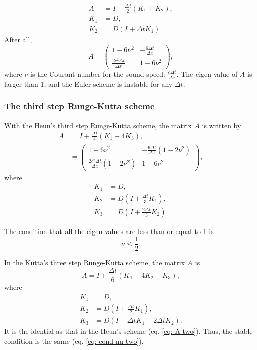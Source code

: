 \begin{align}
  A &= I + \frac{\Delta t}{2}(K_1 + K_2), \\
  K_1 &= D, \\
  K_2 &= D (I + \Delta t K_1).
\end{align}
After all,
\begin{equation}
  A = \begin{pmatrix}
    1-6\nu^2 & -\frac{6\Delta t}{\Delta x} \\
    \frac{2c^2\Delta t}{\Delta x} & 1-6\nu^2
    \end{pmatrix},
\end{equation}
where $\nu$ is the Courant number for the sound speed: $\frac{c\Delta t}{\Delta x}$.
The eigen value of $A$ is larger than 1, and the Euler scheme is instable for any $\Delta t$.



\subsubsection{The third step Runge-Kutta scheme}
With the Heun's third step Runge-Kutta scheme, the matrix $A$ is written by
\begin{align}
  A &= I + \frac{\Delta t}{4}(K_1 + 4K_3), \\
  &= \begin{pmatrix}
    1-6\nu^2 & -\frac{6\Delta t}{\Delta x}(1-2\nu^2) \\
    \frac{2c^2\Delta t}{\Delta x}(1-2\nu^2) & 1-6\nu^2
  \end{pmatrix}, \label{eq: A two}
\end{align}
where
\begin{align}
  K_1 &= D, \\
  K_2 &= D (I + \frac{\Delta t}{3}K_1), \\
  K_3 &= D (I + \frac{2\Delta t}{3}K_2).
\end{align}

The condition that all the eigen values are less than or equal to 1 is
\begin{equation}
  \nu \leq \frac{1}{2}. \label{eq: cond nu two}
\end{equation}

In the Kutta's three step Runge-Kutta scheme, the matrix $A$ is
\begin{equation}
  A = I + \frac{\Delta t}{6}(K_1 + 4K_2 + K_3),
\end{equation}
where
\begin{align}
  K_1 &= D, \\
  K_2 &= D \left(I + \frac{\Delta t}{2}K_1\right), \\
  K_3 &= D \left(I - \Delta t K_1 + 2\Delta t K_2\right).
\end{align}
It is the idential as that in the Heun's scheme (eq. \ref{eq: A two}).
Thus, the stable condition is the same (eq. \ref{eq: cond nu two}).

